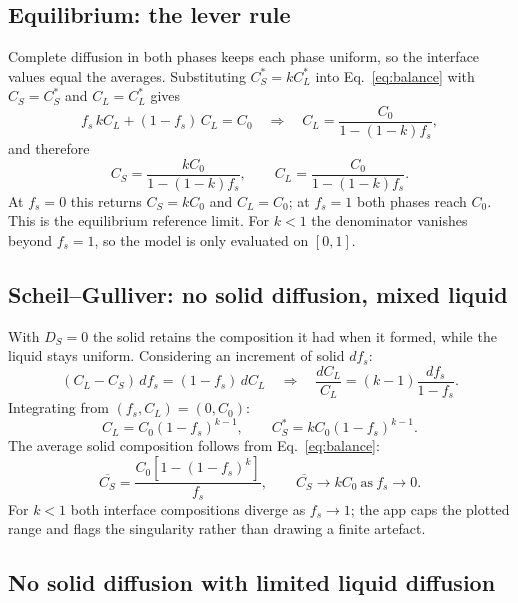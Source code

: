 \documentclass[11pt,a4paper]{article}
\begin{document}
\subsection{Equilibrium: the lever rule}
\label{sec:equilibrium}

Complete diffusion in both phases keeps each phase uniform, so the interface
values equal the averages. Substituting $C_S^*=kC_L^*$ into
Eq.~\eqref{eq:balance} with $C_S=C_S^*$ and $C_L=C_L^*$ gives
\begin{equation}
  f_s\,kC_L + (1-f_s)\,C_L = C_0
  \quad\Longrightarrow\quad
  C_L = \frac{C_0}{1-(1-k)f_s},
\end{equation}
and therefore
\begin{equation}
  \boxed{C_S = \frac{kC_0}{1-(1-k)f_s}},
  \qquad
  \boxed{C_L = \frac{C_0}{1-(1-k)f_s}}.
  \label{eq:lever}
\end{equation}
At $f_s=0$ this returns $C_S=kC_0$ and $C_L=C_0$; at $f_s=1$ both phases reach
$C_0$. This is the equilibrium reference limit. For $k<1$ the denominator
vanishes beyond $f_s=1$, so the model is only evaluated on $[0,1]$.

\subsection{Scheil--Gulliver: no solid diffusion, mixed liquid}

With $D_S=0$ the solid retains the composition it had when it formed, while the
liquid stays uniform. Considering an increment of solid $df_s$:
\begin{equation}
  (C_L-C_S)\,df_s = (1-f_s)\,dC_L
  \quad\Longrightarrow\quad
  \frac{dC_L}{C_L} = (k-1)\frac{df_s}{1-f_s}.
\end{equation}
Integrating from $(f_s,C_L)=(0,C_0)$:
\begin{equation}
  \boxed{C_L = C_0(1-f_s)^{k-1}},
  \qquad
  \boxed{C_S^* = kC_0(1-f_s)^{k-1}}.
  \label{eq:scheil}
\end{equation}
The average solid composition follows from Eq.~\eqref{eq:balance}:
\begin{equation}
  \overline{C_S} = \frac{C_0\left[1-(1-f_s)^k\right]}{f_s},
  \qquad
  \overline{C_S}\to kC_0 \ \text{as}\ f_s\to0.
  \label{eq:scheilavg}
\end{equation}
For $k<1$ both interface compositions diverge as $f_s\to1$; the app caps the
plotted range and flags the singularity rather than drawing a finite artefact.

\subsection{No solid diffusion with limited liquid diffusion}
\label{sec:limited}
\end{document}
